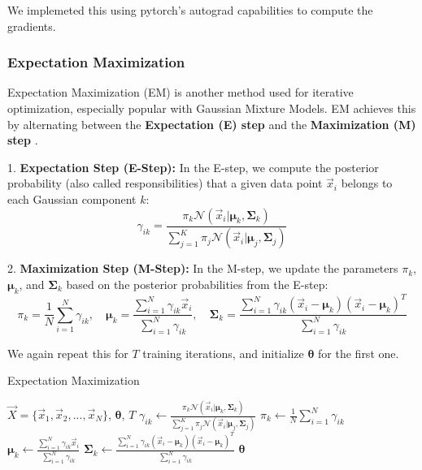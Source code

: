 We implemeted this using pytorch's \cite{pytorch} autograd capabilities to compute the gradients.

\subsubsection{Expectation Maximization}
\label{sec:gmm_em}

Expectation Maximization (EM) is another method used for iterative optimization, especially popular with Gaussian Mixture Models. EM achieves this by alternating between the \textbf{Expectation (E) step} and the \textbf{Maximization (M) step} \cite{ml_book}.

1. \textbf{Expectation Step (E-Step):} In the E-step, we compute the posterior probability (also called responsibilities) that a given data point $\vec{x}_i$ belongs to each Gaussian component $k$:
\[
   \gamma_{ik} = \frac{\pi_k \mathcal{N}(\vec{x}_i|\boldsymbol{\mu}_k, \boldsymbol{\Sigma}_k)}{\sum_{j=1}^{K} \pi_j \mathcal{N}(\vec{x}_i|\boldsymbol{\mu}_j, \boldsymbol{\Sigma}_j)}
\]

2. \textbf{Maximization Step (M-Step):} In the M-step, we update the parameters $\pi_k$, $\boldsymbol{\mu}_k$, and $\boldsymbol{\Sigma}_k$ based on the posterior probabilities from the E-step: 
\[
   \pi_k = \frac{1}{N} \sum_{i=1}^{N} \gamma_{ik}, \quad
   \boldsymbol{\mu}_k = \frac{\sum_{i=1}^{N} \gamma_{ik} \vec{x}_i}{\sum_{i=1}^{N} \gamma_{ik}}, \quad
   \boldsymbol{\Sigma}_k = \frac{\sum_{i=1}^{N} \gamma_{ik} (\vec{x}_i - \boldsymbol{\mu}_k)(\vec{x}_i - \boldsymbol{\mu}_k)^T}{\sum_{i=1}^{N} \gamma_{ik}}
\]

We again repeat this for $T$ training iterations, and initialize $\boldsymbol{\theta}$ for the first one.  \\

\begin{algorithm}
    \caption{Expectation Maximization}
    \label{alg:em_gmm}
    \begin{algorithmic}[1]  
        \Require $\vec X = \{\vec x_1, \vec x_2, ..., \vec x_N\}$, $\boldsymbol{\theta}$, $T$
                    \State $\gamma_{ik} \gets \frac{\pi_k \mathcal{N}(\vec{x}_i|\boldsymbol{\mu}_k, \boldsymbol{\Sigma}_k)}{\sum_{j=1}^{K} \pi_j \mathcal{N}(\vec{x}_i|\boldsymbol{\mu}_j, \boldsymbol{\Sigma}_j)}$
                \EndFor
            \EndFor
                \State $\pi_k \gets \frac{1}{N} \sum_{i=1}^{N} \gamma_{ik}$
                \State $\boldsymbol{\mu}_k \gets \frac{\sum_{i=1}^{N} \gamma_{ik} \vec{x}_i}{\sum_{i=1}^{N} \gamma_{ik}}$
                \State $\boldsymbol{\Sigma}_k \gets \frac{\sum_{i=1}^{N} \gamma_{ik} (\vec{x}_i - \boldsymbol{\mu}_k)(\vec{x}_i - \boldsymbol{\mu}_k)^T}{\sum_{i=1}^{N} \gamma_{ik}}$
            \EndFor
        \EndFor
        \State \Return $\boldsymbol{\theta}$
    \end{algorithmic}
\end{algorithm}

